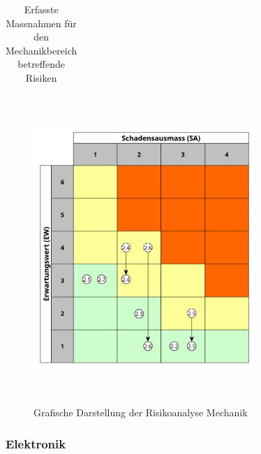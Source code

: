 \documentclass[main.tex]{subfiles} %
\begin{document}
\begin{table}[H]
\begin{tabularx}{\textwidth}{|>{\centering\arraybackslash}p{2cm}|>{\raggedright\arraybackslash}X|>{\centering\arraybackslash}p{0.75cm}|}
        \hline
    \end{tabularx}
    \caption{Erfasste Massnahmen für den Mechanikbereich betreffende Risiken}~\label{tab:Erfasste_Massnahmen_mech}
\end{table}

\begin{figure}[H]
    \centering
    \includegraphics[width=0.75\textwidth]{./fig_Projektmanagement/Diagramm_Risiko_mechanik.pdf}
    \caption{Grafische Darstellung der Risikoanalyse Mechanik}~\label{fig:Diagramm_Risiko_mech}
\end{figure}


\subsubsection*{Elektronik}
\end{document}
